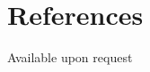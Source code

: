 \documentclass[a4paper, oneside, 10pt]{article}
\begin{document}
\section{References}
\hspace*{15pt}Available upon request
%
\end{document}
